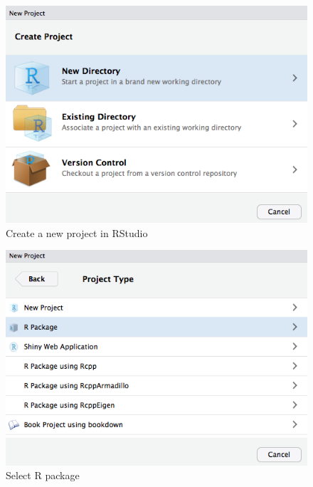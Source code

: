 \documentclass[]{book}
\theoremstyle{definition}
\theoremstyle{definition}
\theoremstyle{definition}
\theoremstyle{remark}
\begin{document}
\begin{figure}

{\centering \includegraphics[width=7.32in]{images/ch3_pkg_2_project} 

}

\caption{Create a new project in RStudio}\label{fig:pkg2}
\end{figure}

\begin{figure}

{\centering \includegraphics[width=7.32in]{images/ch3_pkg_3_package} 

}

\caption{Select R package}\label{fig:pkg3}
\end{figure}
\end{document}
